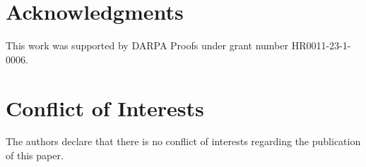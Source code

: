\section*{Acknowledgments}
This work was supported by DARPA Proofs under grant number HR0011-23-1-0006.

\section*{Conflict of Interests}
The authors declare that there is no conflict of interests regarding the publication of this paper.